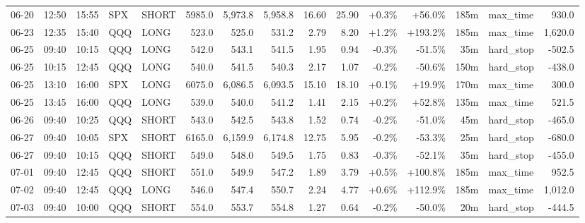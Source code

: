\documentclass[11pt,a4paper,twoside]{article}
\begin{document}
\begin{landscape}
\begin{center}
\begin{longtable}{>{\color{txtmain}}l l l l l r r r r r r r r >{\color{txtmain}}l r}
06-20 & 12:50 & 15:55 & SPX & SHORT & 5985.0 & 5,973.8 & 5,958.8 & 16.60 & 25.90 & \textcolor{wingreen}{+0.3\%} & \textcolor{wingreen}{+56.0\%} & 185m & max\_time & \textcolor{wingreen}{930.0} \\
06-23 & 12:35 & 15:40 & QQQ & LONG & 523.0 & 525.0 & 531.2 & 2.79 & 8.20 & \textcolor{wingreen}{+1.2\%} & \textcolor{wingreen}{+193.2\%} & 185m & max\_time & \textcolor{wingreen}{1,620.0} \\
06-25 & 09:40 & 10:15 & QQQ & LONG & 542.0 & 543.1 & 541.5 & 1.95 & 0.94 & \textcolor{lossred}{-0.3\%} & \textcolor{lossred}{-51.5\%} & 35m & hard\_stop & \textcolor{lossred}{-502.5} \\
06-25 & 10:15 & 12:45 & QQQ & LONG & 540.0 & 541.5 & 540.3 & 2.17 & 1.07 & \textcolor{lossred}{-0.2\%} & \textcolor{lossred}{-50.6\%} & 150m & hard\_stop & \textcolor{lossred}{-438.0} \\
06-25 & 13:10 & 16:00 & SPX & LONG & 6075.0 & 6,086.5 & 6,093.5 & 15.10 & 18.10 & \textcolor{wingreen}{+0.1\%} & \textcolor{wingreen}{+19.9\%} & 170m & max\_time & \textcolor{wingreen}{300.0} \\
06-25 & 13:45 & 16:00 & QQQ & LONG & 539.0 & 540.0 & 541.2 & 1.41 & 2.15 & \textcolor{wingreen}{+0.2\%} & \textcolor{wingreen}{+52.8\%} & 135m & max\_time & \textcolor{wingreen}{521.5} \\
06-26 & 09:40 & 10:25 & QQQ & SHORT & 543.0 & 542.5 & 543.8 & 1.52 & 0.74 & \textcolor{lossred}{-0.2\%} & \textcolor{lossred}{-51.0\%} & 45m & hard\_stop & \textcolor{lossred}{-465.0} \\
06-27 & 09:40 & 10:05 & SPX & SHORT & 6165.0 & 6,159.9 & 6,174.8 & 12.75 & 5.95 & \textcolor{lossred}{-0.2\%} & \textcolor{lossred}{-53.3\%} & 25m & hard\_stop & \textcolor{lossred}{-680.0} \\
06-27 & 09:40 & 10:15 & QQQ & SHORT & 549.0 & 548.0 & 549.5 & 1.75 & 0.83 & \textcolor{lossred}{-0.3\%} & \textcolor{lossred}{-52.1\%} & 35m & hard\_stop & \textcolor{lossred}{-455.0} \\
07-01 & 09:40 & 12:45 & QQQ & SHORT & 551.0 & 549.9 & 547.2 & 1.89 & 3.79 & \textcolor{wingreen}{+0.5\%} & \textcolor{wingreen}{+100.8\%} & 185m & max\_time & \textcolor{wingreen}{952.5} \\
07-02 & 09:40 & 12:45 & QQQ & LONG & 546.0 & 547.4 & 550.7 & 2.24 & 4.77 & \textcolor{wingreen}{+0.6\%} & \textcolor{wingreen}{+112.9\%} & 185m & max\_time & \textcolor{wingreen}{1,012.0} \\
07-03 & 09:40 & 10:00 & QQQ & SHORT & 554.0 & 553.7 & 554.8 & 1.27 & 0.64 & \textcolor{lossred}{-0.2\%} & \textcolor{lossred}{-50.0\%} & 20m & hard\_stop & \textcolor{lossred}{-444.5} \\

\end{longtable}
\end{center}
\end{landscape}
\end{document}
